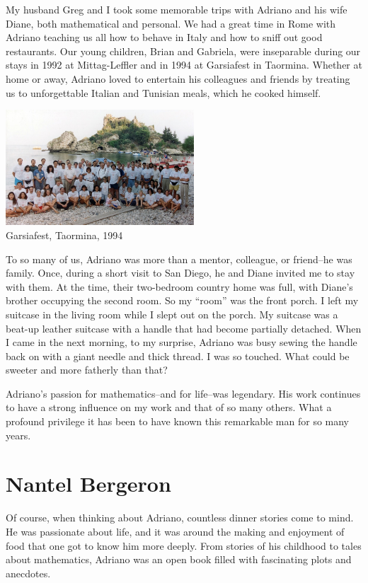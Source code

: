 \documentclass{notices}
\begin{document}
My husband Greg and I took some memorable trips with Adriano and his wife Diane, both mathematical and personal.  We had a great time in Rome with Adriano teaching us all how to behave in Italy and how to sniff out good restaurants. Our young children, Brian and Gabriela, were inseparable during our stays in 1992 at Mittag-Leffler and in 1994 at Garsiafest in Taormina. Whether at home or away,  Adriano loved to entertain his colleagues and friends by treating us to unforgettable Italian and Tunisian meals, which he cooked himself.

\begin{center}
 \includegraphics[height=1.7in]{Michelle_Wachs/EmbeddedImage.jpeg} 
 \\ {\footnotesize Garsiafest, Taormina, 1994}
\end{center}

To so many of us, Adriano was more than a mentor, colleague, or friend--he was family.  Once, during a short visit to San Diego, he and Diane invited me to stay with them. At the time, their two-bedroom country home  was full, with Diane’s brother occupying the second room.  So my ``room'' was the front porch.   I left my suitcase in the living room while I slept out on the porch.  My suitcase was a  beat-up leather suitcase with a handle that had become partially detached.  When I came in the next morning, to my surprise, Adriano  was busy sewing the handle back on with a giant needle and thick thread. I was so touched. What could be sweeter and more fatherly than that?  

Adriano’s passion for mathematics--and for life--was legendary.  His work continues to have a strong influence on my work and that of so many others.  What a profound privilege it has been to have known this remarkable man for so many years.

\section*{Nantel Bergeron}
Of course, when thinking about Adriano, countless dinner stories come to mind. He was passionate about life, and it was around the making and enjoyment of food that one got to know him more deeply. From stories of his childhood to tales about mathematics, Adriano was an open book filled with fascinating plots and anecdotes.
\end{document}
